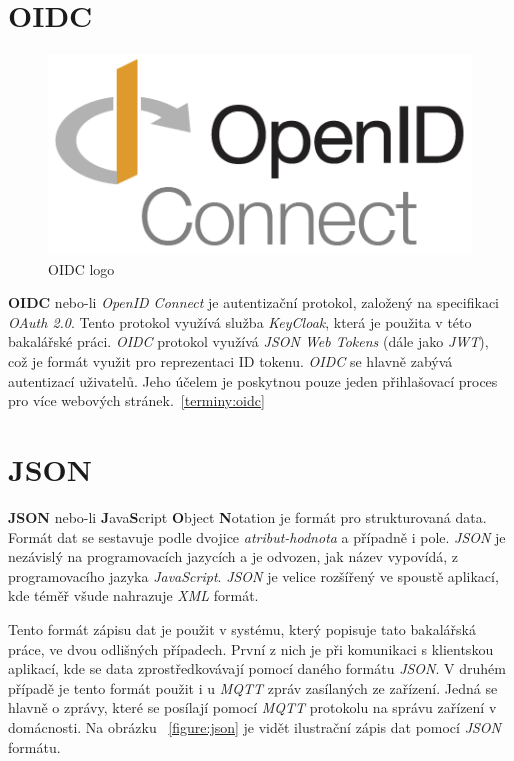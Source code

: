 \newpage

\section{OIDC}
\label{app_prostredi:oidc}

\begin{figure}[hbt]
  \centering
  \includegraphics[width=.35 \linewidth]{obrazky-figures/OIDC.png}
  \caption{OIDC logo}
\end{figure}

\textbf{OIDC} nebo-li \emph{OpenID Connect} je autentizační protokol, založený na specifikaci \emph{OAuth 2.0}. Tento protokol využívá služba \emph{KeyCloak}, která je použita v této bakalářské práci.
\emph{OIDC} protokol využívá \emph{JSON Web Tokens} (dále jako \emph{JWT}), což je formát využit pro reprezentaci ID tokenu.
\emph{OIDC} se hlavně zabývá autentizací uživatelů.
Jeho účelem je poskytnou pouze jeden přihlašovací proces pro více webových stránek.~\ref{terminy:oidc}

\section{JSON}
\label{terminy:json}

\textbf{JSON} nebo-li \textbf{J}ava\textbf{S}cript \textbf{O}bject \textbf{N}otation je formát pro strukturovaná data.
Formát dat se sestavuje podle dvojice \emph{atribut-hodnota} a případně i pole.
\emph{JSON} je nezávislý na programovacích jazycích a je odvozen, jak název vypovídá, z programovacího jazyka \emph{JavaScript}.
\emph{JSON} je velice rozšířený ve spoustě aplikací, kde téměř všude nahrazuje \emph{XML} formát.

Tento formát zápisu dat je použit v systému, který popisuje tato bakalářská práce, ve dvou odlišných případech.
První z nich je při komunikaci s klientskou aplikací, kde se data zprostředkovávají pomocí daného formátu \emph{JSON}.
V druhém případě je tento formát použit i u \emph{MQTT} zpráv zasílaných ze zařízení.
Jedná se hlavně o zprávy, které se posílají pomocí \emph{MQTT} protokolu na správu zařízení v domácnosti.
Na obrázku ~\ref{figure:json} je vidět ilustrační zápis dat pomocí \emph{JSON} formátu.

